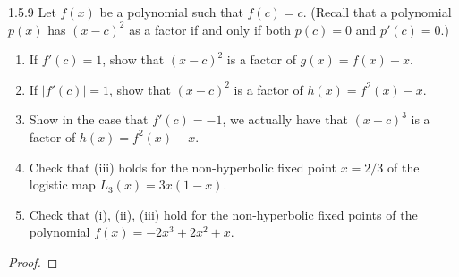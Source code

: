 \begin{problem}{1.5.9}
  Let $f(x)$ be a polynomial such that $f(c) = c$. (Recall that a polynomial
  $p(x)$ has $(x-c)^2$ as a factor if and only if both $p(c) = 0$ and $p'(c) = 0$.)
  \begin{enumerate}
    \item If $f'(c) = 1$, show that $(x-c)^2$ is a factor of $g(x) = f(x) - x$.
    \item If $|f'(c)| = 1$, show that $(x-c)^2$ is a factor of $h(x) = f^2(x) - x$.
    \item Show in the case that $f'(c) = -1$, we actually have that $(x-c)^3$ is a
      factor of $h(x) = f^2(x) - x$.
    \item Check that (iii) holds for the non-hyperbolic fixed point $x=2/3$ of the logistic
      map $L_3(x) = 3x(1-x)$.
    \item Check that (i), (ii), (iii) hold for the non-hyperbolic fixed points
      of the polynomial $f(x) = -2x^3 + 2x^2 + x$.
  \end{enumerate}
\end{problem}

\begin{proof}
\end{proof}
\newpage
